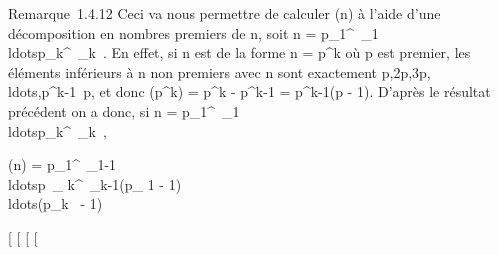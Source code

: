 \documentclass[]{article}
\begin{document}
Remarque~1.4.12 Ceci va nous permettre de calculer \phi(n) à l'aide d'une
décomposition en nombres premiers de n, soit n =
p\_1^\alpha~\_1\\ldotsp\_k^\alpha~\_k~.
En effet, si n est de la forme n = p^k où p est premier, les
éléments inférieurs à n non premiers avec n sont exactement
p,2p,3p,\\ldots,p^k-1~p,
et donc \phi(p^k) = p^k - p^k-1 =
p^k-1(p - 1). D'après le résultat précédent on a donc, si n =
p\_1^\alpha~\_1\\ldotsp\_k^\alpha~\_k~,

\phi(n) =
p\_1^\alpha~\_1-1\\ldotsp~\_
k^\alpha~\_k-1(p\_ 1 -
1)\\ldots(p\_k~
- 1)

{[}
{[}
{[}
{[}
\end{document}
